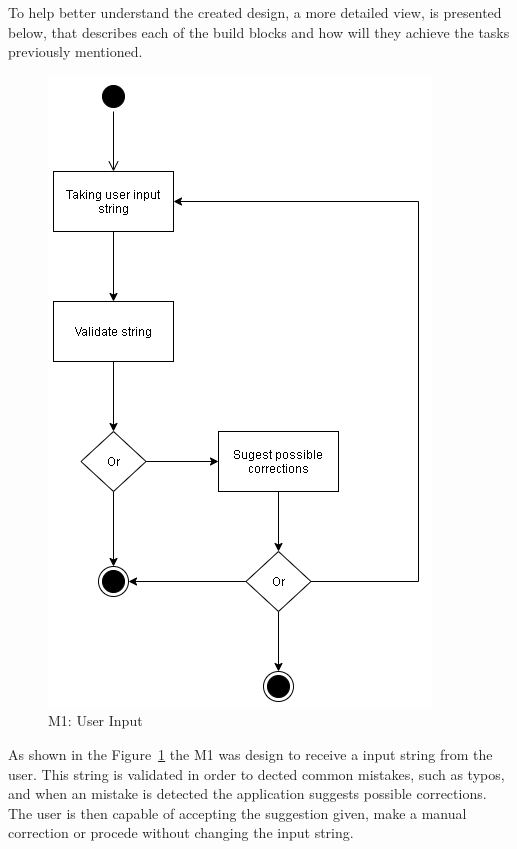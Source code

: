 To help better understand the created design, a more detailed view, is presented below, that describes each of the build blocks and how will they achieve the tasks previously mentioned.

\begin{figure}[H]
\centering
\includegraphics[scale=0.5]{ch4/assets/M1.png}
\caption[User Input Module]{M1: User Input}
\label{fig:M1}
\end{figure}

As shown in the Figure~\ref{fig:M1} the M1 was design to receive a input string from the user.
This string is validated in order to dected common mistakes, such as typos, and when an mistake is detected the application suggests possible corrections.
The user is then capable of accepting the suggestion given, make a manual correction or procede without changing the input string.

